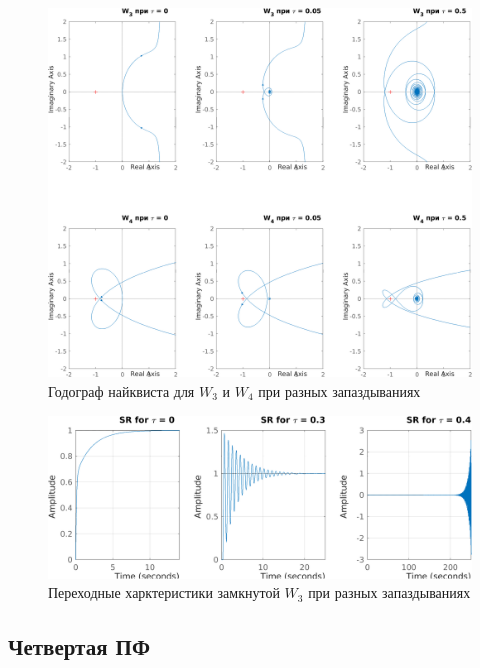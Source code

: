 \begin{figure}[H]
    \centering
    \includegraphics[width=\textwidth]{figs/task_3_taus_nyaquist.png}
    \caption{Годограф найквиста для $W_3$ и $W_4$ при разных запаздываниях}
    \label{fig:W34_nyquist}
\end{figure}


\begin{figure}[H]
    \centering
    \includegraphics[width=\textwidth]{figs/task_3_W3_tausteps.png}
    \caption{Переходные харктеристики замкнутой $W_3$ при разных запаздываниях}
    \label{fig:W3_steps}
\end{figure}

\subsection{Четвертая ПФ}

